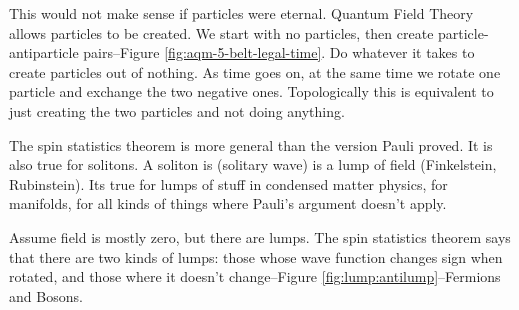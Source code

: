 \documentclass[]{article}
\begin{document}
This would not make sense if particles were eternal. Quantum Field Theory allows particles to be created. We start with no particles, then create particle-antiparticle pairs--Figure \ref{fig:aqm-5-belt-legal-time}. Do whatever it takes to create particles out of nothing. As time goes on, at the same time we rotate one particle and exchange the two negative ones. Topologically this is equivalent to just creating the two particles and not doing anything.

The spin statistics theorem is more general than the version Pauli proved. It is also true for solitons. A soliton is (solitary wave) is a lump of field (Finkelstein, Rubinstein). Its true for lumps of stuff in condensed matter physics, for manifolds, for all kinds of things where Pauli's argument doesn't apply.


Assume field is mostly zero, but there are lumps. The spin statistics theorem says that there are two kinds of lumps: those whose wave function changes sign when rotated, and those where it doesn't change--Figure \ref{fig:lump:antilump}--Fermions and Bosons.
\end{document}
